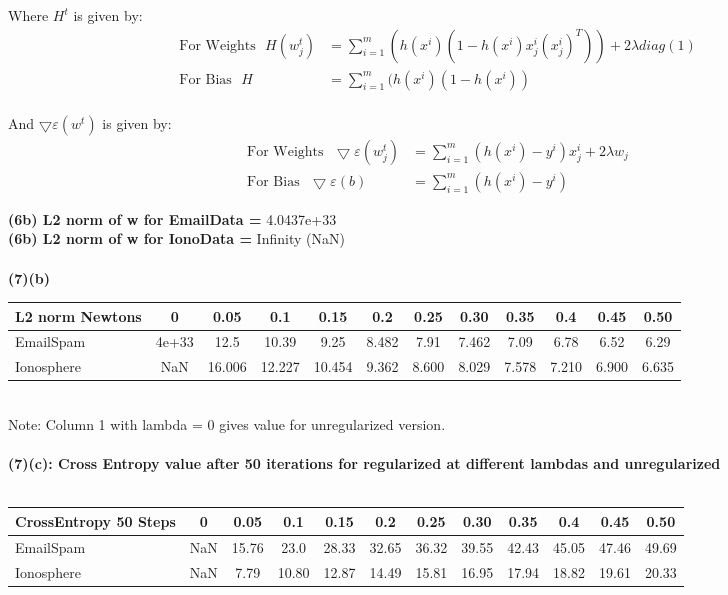 \documentclass[paper=a4, fontsize=11pt]{scrartcl} %
\numberwithin{equation}{section} %
\numberwithin{figure}{section} %
\numberwithin{table}{section} %
\begin{document}
Where $H^{t}$ is given by:
\begin{align*}
\text{For Weights}~~~ H(w^{t}_{j}) &= \sum_{i=1}^{m}(h(x^{i})(1-h(x^{i})x^{i}_{j}(x^{i}_{j})^{T}))+ 2\lambda diag(1)\\
\text{For Bias}~~~ H &= \sum_{i=1}^{m}(h(x^{i})(1-h(x^{i})) \\
\end{align*}

And $\bigtriangledown\varepsilon(w^{t})$ is given by:
\begin{align*}
\text{For Weights}~~~ \bigtriangledown\varepsilon(w^{t}_{j}) &= \sum_{i=1}^{m}(h(x^{i}) - y^{i})x^{i}_{j} + 2\lambda w_{j}\\
\text{For Bias}~~~ 
\bigtriangledown\varepsilon(b) &= \sum_{i=1}^{m}(h(x^{i}) - y^{i})
\end{align*}

\textbf{(6b) L2 norm of w for EmailData = }4.0437e+33\\
\textbf{(6b) L2 norm of w for IonoData = }Infinity (NaN)\\\\


\textbf{(7)(b)}
\begin{tabular}{l*{11}{c}}
L2 norm Newtons	& 0 & 0.05 & 0.1 & 0.15 & 0.2 & 0.25 & 0.30 & 0.35 & 0.4 & 0.45 & 0.50 \\
\hline
EmailSpam & 4e+33 & 12.5 & 10.39 & 9.25 & 8.482 & 7.91 & 7.462 & 7.09 & 6.78 & 6.52 & 6.29\\
Ionosphere & NaN & 16.006 & 12.227 & 10.454 & 9.362 & 8.600 & 8.029 & 7.578 & 7.210 & 6.900 & 6.635
\end{tabular}\\

Note: Column 1 with lambda = 0 gives value for unregularized version.\\\\


\textbf{(7)(c): Cross Entropy value after 50 iterations for regularized at different lambdas and unregularized }\\\\
\begin{tabular}{l*{11}{c}}
CrossEntropy 50 Steps	& 0 & 0.05 & 0.1 & 0.15 & 0.2 & 0.25 & 0.30 & 0.35 & 0.4 & 0.45 & 0.50 \\
\hline
EmailSpam & NaN & 15.76 & 23.0 & 28.33 & 32.65 & 36.32 & 39.55 & 42.43 & 45.05 & 47.46 & 49.69\\
Ionosphere & NaN & 7.79 & 10.80 & 12.87 & 14.49 & 15.81 & 16.95 & 17.94 & 18.82 & 19.61 & 20.33
\end{tabular}\\\\
\end{document}
